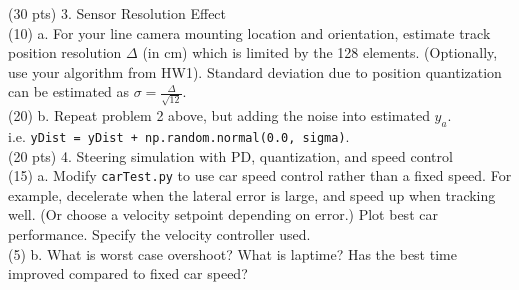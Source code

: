 \documentclass[11pt]{article}
\begin{document}
(30 pts) 3. Sensor Resolution Effect\\
(10) a. For your line camera mounting location and orientation,
estimate track position resolution $\Delta$ (in cm) which is limited by the 128
elements. (Optionally, use your algorithm from HW1).  
Standard deviation due to position quantization can be estimated as
$\sigma = \frac{\Delta}{\sqrt{12}}$.\\
(20) b. Repeat problem 2 above, but adding the noise into 
estimated $y_a$.\\
i.e. {\tt  yDist = yDist + np.random.normal(0.0, sigma)}.\\

(20 pts) 4. Steering simulation with PD, quantization, and speed control\\
(15) a. Modify {\tt carTest.py} to use
car speed control rather than a fixed speed.
For example, decelerate when the lateral error is large, and speed
up when tracking well. (Or choose a velocity setpoint depending
on error.) Plot best car performance. Specify the velocity
controller used.\\
(5) b. What is worst case overshoot? What is laptime? Has the 
best time improved compared to fixed car speed?\\
\end{document}
